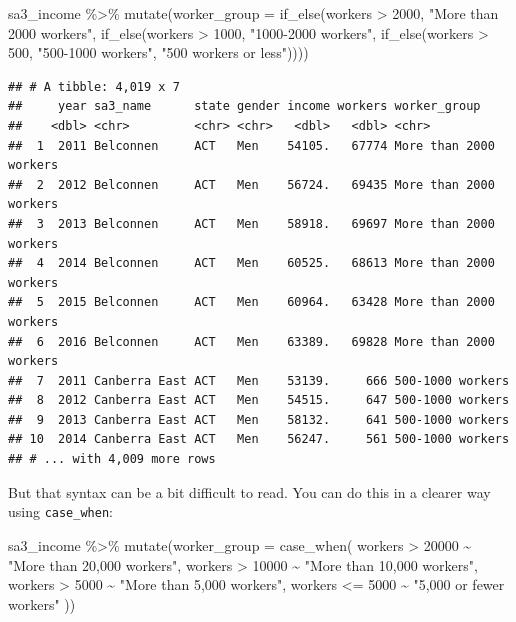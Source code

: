 \documentclass[
]{book}
\newenvironment{Shaded}{\begin{snugshade}}{\end{snugshade}}
\newcommand{\AttributeTok}[1]{\textcolor[rgb]{0.77,0.63,0.00}{#1}}
\newcommand{\DecValTok}[1]{\textcolor[rgb]{0.00,0.00,0.81}{#1}}
\newcommand{\FunctionTok}[1]{\textcolor[rgb]{0.00,0.00,0.00}{#1}}
\newcommand{\NormalTok}[1]{#1}
\newcommand{\SpecialCharTok}[1]{\textcolor[rgb]{0.00,0.00,0.00}{#1}}
\newcommand{\StringTok}[1]{\textcolor[rgb]{0.31,0.60,0.02}{#1}}
\begin{document}
\begin{Shaded}
\begin{Highlighting}[]
\NormalTok{sa3\_income }\SpecialCharTok{\%\textgreater{}\%} 
  \FunctionTok{mutate}\NormalTok{(}\AttributeTok{worker\_group =} \FunctionTok{if\_else}\NormalTok{(workers }\SpecialCharTok{\textgreater{}} \DecValTok{2000}\NormalTok{, }\StringTok{"More than 2000 workers"}\NormalTok{, }
                                \FunctionTok{if\_else}\NormalTok{(workers }\SpecialCharTok{\textgreater{}} \DecValTok{1000}\NormalTok{, }\StringTok{"1000{-}2000 workers"}\NormalTok{,}
                                        \FunctionTok{if\_else}\NormalTok{(workers }\SpecialCharTok{\textgreater{}} \DecValTok{500}\NormalTok{, }\StringTok{"500{-}1000 workers"}\NormalTok{,}
                                                \StringTok{"500 workers or less"}\NormalTok{))))}
\end{Highlighting}
\end{Shaded}

\begin{verbatim}
## # A tibble: 4,019 x 7
##     year sa3_name      state gender income workers worker_group          
##    <dbl> <chr>         <chr> <chr>   <dbl>   <dbl> <chr>                 
##  1  2011 Belconnen     ACT   Men    54105.   67774 More than 2000 workers
##  2  2012 Belconnen     ACT   Men    56724.   69435 More than 2000 workers
##  3  2013 Belconnen     ACT   Men    58918.   69697 More than 2000 workers
##  4  2014 Belconnen     ACT   Men    60525.   68613 More than 2000 workers
##  5  2015 Belconnen     ACT   Men    60964.   63428 More than 2000 workers
##  6  2016 Belconnen     ACT   Men    63389.   69828 More than 2000 workers
##  7  2011 Canberra East ACT   Men    53139.     666 500-1000 workers      
##  8  2012 Canberra East ACT   Men    54515.     647 500-1000 workers      
##  9  2013 Canberra East ACT   Men    58132.     641 500-1000 workers      
## 10  2014 Canberra East ACT   Men    56247.     561 500-1000 workers      
## # ... with 4,009 more rows
\end{verbatim}

But that syntax can be a bit difficult to read. You can do this in a clearer way using \texttt{case\_when}:

\begin{Shaded}
\begin{Highlighting}[]
\NormalTok{sa3\_income }\SpecialCharTok{\%\textgreater{}\%} 
  \FunctionTok{mutate}\NormalTok{(}\AttributeTok{worker\_group =} \FunctionTok{case\_when}\NormalTok{(}
\NormalTok{    workers }\SpecialCharTok{\textgreater{}} \DecValTok{20000} \SpecialCharTok{\textasciitilde{}} \StringTok{"More than 20,000 workers"}\NormalTok{,}
\NormalTok{    workers }\SpecialCharTok{\textgreater{}} \DecValTok{10000} \SpecialCharTok{\textasciitilde{}} \StringTok{"More than 10,000 workers"}\NormalTok{,}
\NormalTok{    workers }\SpecialCharTok{\textgreater{}}  \DecValTok{5000} \SpecialCharTok{\textasciitilde{}} \StringTok{"More than 5,000 workers"}\NormalTok{,}
\NormalTok{    workers }\SpecialCharTok{\textless{}=} \DecValTok{5000} \SpecialCharTok{\textasciitilde{}} \StringTok{"5,000 or fewer workers"}
\NormalTok{  ))}
\end{Highlighting}
\end{Shaded}
\end{document}
